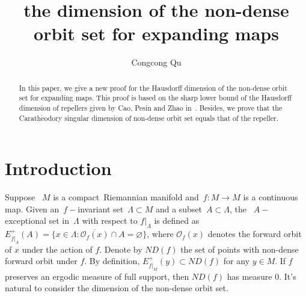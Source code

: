 \documentclass[11pt,a4paper]{amsart}
\theoremstyle{plain}
\theoremstyle{remark}
\begin{document}
	
	\title[]
	{the dimension of the non-dense orbit set for expanding maps}
	\author{Congcong Qu}
	\address{Congcong Qu, College of Big Data and software Engineering, Zhejiang Wanli University, Ningbo, 315107, Zhejiang, P.R.China}

	
	
	
	
	\begin{abstract}
		In this paper, we give a new proof for  the Hausdorff dimension of the non-dense orbit set for expanding maps. This proof is based on the sharp lower bound of the Hausdorff dimension of  repellers given by Cao, Pesin and Zhao in~\cite{caopesinzhao2019}. Besides, we prove that the Carath$\acute{\text{e}}$odory singular dimension of non-dense orbit set equals that of the repeller.
	\end{abstract}
	
	\maketitle
	
	
	\section{Introduction}
	Suppose ~$M$ is a compact~Riemannian manifold and~$f:M\rightarrow M$ is a continuous map. Given an~$f-$invariant set~$\Lambda\subset M$ and a subset~$A\subset \Lambda$, the ~$A-$exceptional set in~$\Lambda$ with respect to $f|_{\Lambda}$ is defined as~$E^{+}_{f|_{\Lambda}}(A)=\{x\in \Lambda:\overline{\mathcal{O}_{f}(x)}\cap A={\varnothing}\}$, where $\mathcal{O}_{f}(x)$ denotes the forward orbit of $x$ under the action of $f$. Denote by $ND(f)$ the set of points with non-dense forward orbit under $f$. By definition, $E^+_{f|_M}(y)\subset ND(f)$ for any $y\in M$. If $f$ preserves an ergodic measure of full support, then $ND(f)$ has measure $0$. It's natural to consider the dimension of the non-dense orbit set.
	
\end{document}
